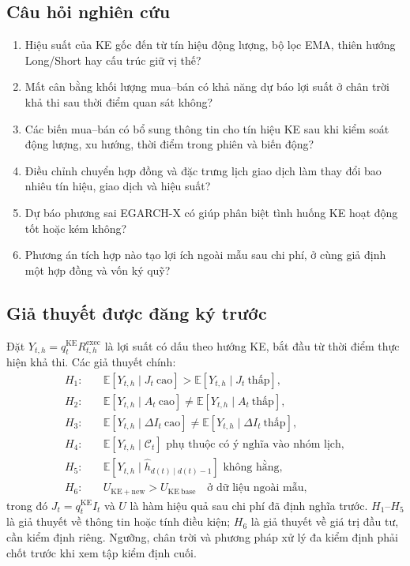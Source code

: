 \documentclass[12pt,a4paper,oneside]{article}
\newcommand{\E}{\mathbb{E}}
\begin{document}
\subsection{Câu hỏi nghiên cứu}
\begin{enumerate}[label=Q\arabic*.]
\item Hiệu suất của KE gốc đến từ tín hiệu động lượng, bộ lọc EMA, thiên hướng Long/Short hay cấu trúc giữ vị thế?
\item Mất cân bằng khối lượng mua--bán có khả năng dự báo lợi suất ở chân trời khả thi sau thời điểm quan sát không?
\item Các biến mua--bán có bổ sung thông tin cho tín hiệu KE sau khi kiểm soát động lượng, xu hướng, thời điểm trong phiên và biến động?
\item Điều chỉnh chuyển hợp đồng và đặc trưng lịch giao dịch làm thay đổi bao nhiêu tín hiệu, giao dịch và hiệu suất?
\item Dự báo phương sai EGARCH-X có giúp phân biệt tình huống KE hoạt động tốt hoặc kém không?
\item Phương án tích hợp nào tạo lợi ích ngoài mẫu sau chi phí, ở cùng giả định một hợp đồng và vốn ký quỹ?
\end{enumerate}

\subsection{Giả thuyết được đăng ký trước}
Đặt $Y_{t,h}=q_t^{\mathrm{KE}}R_{t,h}^{\mathrm{exec}}$ là lợi suất có dấu theo hướng KE, bắt đầu từ thời điểm thực hiện khả thi. Các giả thuyết chính:
\begin{align}
H_{1}:&\quad \E[Y_{t,h}\mid J_t\ \text{cao}]>\E[Y_{t,h}\mid J_t\ \text{thấp}],\\
H_{2}:&\quad \E[Y_{t,h}\mid A_t\ \text{cao}]\neq\E[Y_{t,h}\mid A_t\ \text{thấp}],\\
H_{3}:&\quad \E[Y_{t,h}\mid \Delta I_t\ \text{cao}]\neq\E[Y_{t,h}\mid \Delta I_t\ \text{thấp}],\\
H_{4}:&\quad \E[Y_{t,h}\mid\mathcal C_t]\text{ phụ thuộc có ý nghĩa vào nhóm lịch},\\
H_{5}:&\quad \E[Y_{t,h}\mid\widehat h_{d(t)\mid d(t)-1}]\text{ không hằng},\\
H_{6}:&\quad U_{\mathrm{KE+new}}>U_{\mathrm{KE\ base}}
\quad\text{ở dữ liệu ngoài mẫu},
\end{align}
trong đó $J_t=q_t^{\mathrm{KE}}I_t$ và $U$ là hàm hiệu quả sau chi phí đã định nghĩa trước. $H_1$--$H_5$ là giả thuyết về thông tin hoặc tính điều kiện; $H_6$ là giả thuyết về giá trị đầu tư, cần kiểm định riêng. Ngưỡng, chân trời và phương pháp xử lý đa kiểm định phải chốt trước khi xem tập kiểm định cuối.
\end{document}
